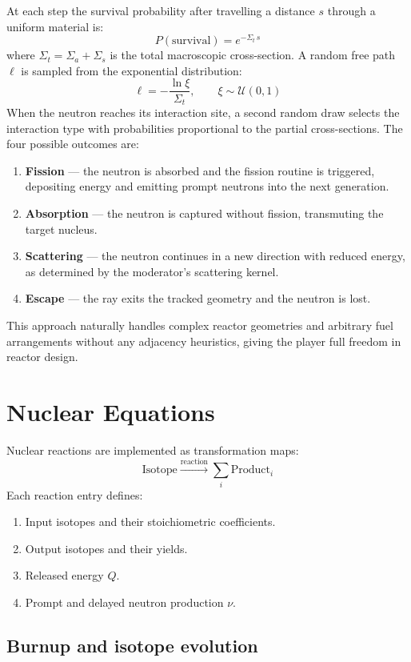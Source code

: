 \documentclass{report}
\begin{document}
At each step the survival probability after travelling a distance $s$ through a uniform
material is:
\[
P(\text{survival}) = e^{-\Sigma_t\, s}
\]
where $\Sigma_t = \Sigma_a + \Sigma_s$ is the total macroscopic cross-section. A random
free path $\ell$ is sampled from the exponential distribution:
\[
\ell = -\frac{\ln \xi}{\Sigma_t}, \qquad \xi \sim \mathcal{U}(0,1)
\]
When the neutron reaches its interaction site, a second random draw selects the
interaction type with probabilities proportional to the partial cross-sections. The
four possible outcomes are:
\begin{enumerate}
    \item \textbf{Fission} — the neutron is absorbed and the fission routine is triggered,
          depositing energy and emitting prompt neutrons into the next generation.
    \item \textbf{Absorption} — the neutron is captured without fission, transmuting the
          target nucleus.
    \item \textbf{Scattering} — the neutron continues in a new direction with reduced energy,
          as determined by the moderator's scattering kernel.
    \item \textbf{Escape} — the ray exits the tracked geometry and the neutron is lost.
\end{enumerate}

This approach naturally handles complex reactor geometries and arbitrary fuel arrangements
without any adjacency heuristics, giving the player full freedom in reactor design.

\section{Nuclear Equations}

Nuclear reactions are implemented as transformation maps:
\[
\text{Isotope} \xrightarrow{\text{reaction}} \sum_i \text{Product}_i
\]
Each reaction entry defines:
\begin{enumerate}
    \item Input isotopes and their stoichiometric coefficients.
    \item Output isotopes and their yields.
    \item Released energy $Q$.
    \item Prompt and delayed neutron production $\nu$.
\end{enumerate}

\subsection{Burnup and isotope evolution}
\end{document}
